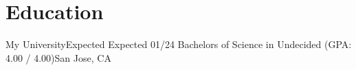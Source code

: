 \section{Education}
    \resumeSubHeadingListStart

    \resumeSubheading
    {My University}{Expected Expected 01/24}
    {Bachelors of Science in Undecided (GPA: 4.00 / 4.00)}{San Jose, CA}
    \resumeItemListStart
    \resumeItemListEnd

    \resumeSubHeadingListEnd
